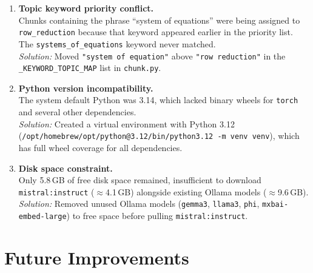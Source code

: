 \documentclass[11pt]{article}
\begin{document}
\begin{enumerate}[leftmargin=*, label=\textbf{\arabic*.}]
\item \textbf{Topic keyword priority conflict.}\\
Chunks containing the phrase ``system of equations'' were being assigned to \texttt{row\_reduction} because that keyword appeared earlier in the priority list. The \texttt{systems\_of\_equations} keyword never matched.\\
\textit{Solution:} Moved \texttt{"system of equation"} above \texttt{"row reduction"} in the \texttt{\_KEYWORD\_TOPIC\_MAP} list in \texttt{chunk.py}.

\item \textbf{Python version incompatibility.}\\
The system default Python was 3.14, which lacked binary wheels for \texttt{torch} and several other dependencies.\\
\textit{Solution:} Created a virtual environment with Python 3.12 (\texttt{/opt/homebrew/opt/python@3.12/bin/python3.12 -m venv venv}), which has full wheel coverage for all dependencies.

\item \textbf{Disk space constraint.}\\
Only 5.8\,GB of free disk space remained, insufficient to download \texttt{mistral:instruct} ($\approx$4.1\,GB) alongside existing Ollama models ($\approx$9.6\,GB).\\
\textit{Solution:} Removed unused Ollama models (\texttt{gemma3}, \texttt{llama3}, \texttt{phi}, \texttt{mxbai-embed-large}) to free space before pulling \texttt{mistral:instruct}.

\end{enumerate}

\section{Future Improvements}
\end{document}
